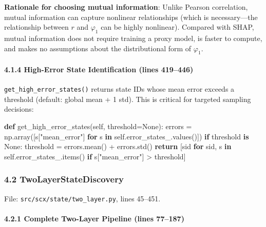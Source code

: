 \documentclass[
  12pt,
]{article}
\newenvironment{Shaded}{}{}
\newcommand{\ControlFlowTok}[1]{\textcolor[rgb]{0.00,0.44,0.13}{\textbf{#1}}}
\newcommand{\KeywordTok}[1]{\textcolor[rgb]{0.00,0.44,0.13}{\textbf{#1}}}
\newcommand{\NormalTok}[1]{#1}
\newcommand{\OperatorTok}[1]{\textcolor[rgb]{0.40,0.40,0.40}{#1}}
\newcommand{\StringTok}[1]{\textcolor[rgb]{0.25,0.44,0.63}{#1}}
\newcommand{\VariableTok}[1]{\textcolor[rgb]{0.10,0.09,0.49}{#1}}
\begin{document}
\textbf{Rationale for choosing mutual information}: Unlike Pearson correlation, mutual information can capture nonlinear relationships (which is necessary---the relationship between $r$ and $\varphi_1$ can be highly nonlinear). Compared with SHAP, mutual information does not require training a proxy model, is faster to compute, and makes no assumptions about the distributional form of $\varphi_1$.

\paragraph{4.1.4 High-Error State Identification (lines 419--446)}\label{high-error-state-identification}

\texttt{get\_high\_error\_states()} returns state IDs whose mean error exceeds a threshold (default: global mean + 1 std). This is critical for targeted sampling decisions:

\begin{Shaded}
\begin{Highlighting}[]
\KeywordTok{def}\NormalTok{ get\_high\_error\_states(}\VariableTok{self}\NormalTok{, threshold}\OperatorTok{=}\VariableTok{None}\NormalTok{):}
\NormalTok{    errors }\OperatorTok{=}\NormalTok{ np.array([s[}\StringTok{"mean\_error"}\NormalTok{] }\ControlFlowTok{for}\NormalTok{ s }\KeywordTok{in} \VariableTok{self}\NormalTok{.error\_states\_.values()])}
    \ControlFlowTok{if}\NormalTok{ threshold }\KeywordTok{is} \VariableTok{None}\NormalTok{:}
\NormalTok{        threshold }\OperatorTok{=}\NormalTok{ errors.mean() }\OperatorTok{+}\NormalTok{ errors.std()}
    \ControlFlowTok{return}\NormalTok{ [sid }\ControlFlowTok{for}\NormalTok{ sid, s }\KeywordTok{in} \VariableTok{self}\NormalTok{.error\_states\_.items()}
            \ControlFlowTok{if}\NormalTok{ s[}\StringTok{"mean\_error"}\NormalTok{] }\OperatorTok{\textgreater{}}\NormalTok{ threshold]}
\end{Highlighting}
\end{Shaded}

\subsubsection{4.2 TwoLayerStateDiscovery}\label{twolayerstatediscovery}

File: \texttt{src/scx/state/two\_layer.py}, lines 45--451.

\paragraph{4.2.1 Complete Two-Layer Pipeline (lines 77--187)}\label{complete-two-layer-pipeline}
\end{document}
